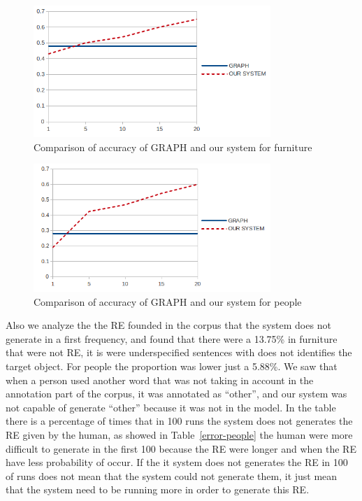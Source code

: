 \begin{figure}[ht]
\centering
\includegraphics[width=0.8\textwidth]{images/furniturePrec.png}
\caption{Comparison of accuracy of GRAPH and our system for furniture}
\label{graficoPresicionFurniture}
\end{figure}

\begin{figure}[ht]
\centering
\includegraphics[width=0.8\textwidth]{images/peoplePrec.png}
\caption{Comparison of accuracy of GRAPH and our system for people}
\label{graficoPresicionPeople}
\end{figure}

Also we analyze the the RE founded in the corpus that the system does not generate in a first frequency, and found that there were a 13.75\% in furniture that were not RE, it is were underspecified sentences with does not identifies the target object. For people the proportion was lower just a 5.88\%. We saw that when a person used another word that was not taking in account in the annotation part of the corpus, it was annotated as ``other'', and our system was not capable of generate ``other'' because it was not in the model.
In the table there is a percentage of times that in 100 runs the system does not generates the RE given by the human, as showed in Table~\ref{error-people} the human were more difficult to generate in the first 100 because the RE were longer and when the RE have less probability of occur. If the it system does not generates the RE in 100 of runs does not mean that the system could not generate them, it just mean that the system need to be running more in order to generate this RE.\\


